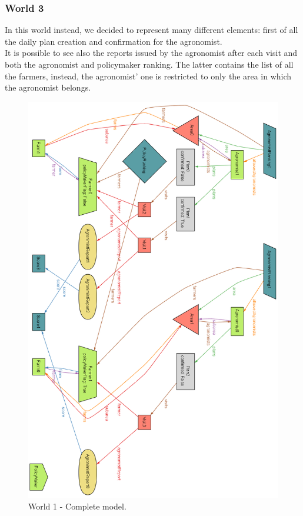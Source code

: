 \subsubsection{World 3}
In this world instead, we decided to represent many different elements: first of all the daily plan creation and confirmation for the agronomist.\\
It is possible to see also the reports issued by the agronomist after each visit and both the agronomist and policymaker ranking.
The latter contains the list of all the farmers, instead, the agronomist' one is restricted to only the area in which the agronomist belongs.
\begin{figure}[H]
\centering
\includegraphics[scale=0.4]{../AlloyCode/ExportWorldPNG/world3_agro_policymaker_reports_rankings.png}
\caption{\label{fig:alloyExecution}World 1 - Complete model.}
\end{figure}

